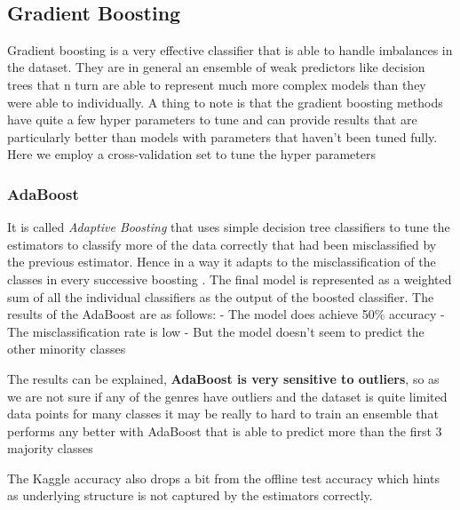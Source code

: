 \documentclass[11pt]{article}
\begin{document}
    \begin{center}
    \end{center}
    { \hspace*{\fill} \\}
    
    \hypertarget{gradient-boosting}{%
\subsection{Gradient Boosting}\label{gradient-boosting}}

Gradient boosting is a very effective classifier that is able to handle
imbalances in the dataset. They are in general an ensemble of weak
predictors like decision trees that n turn are able to represent much
more complex models than they were able to individually. A thing to note
is that the gradient boosting methods have quite a few hyper parameters
to tune and can provide results that are particularly better than models
with parameters that haven't been tuned fully. Here we employ a
cross-validation set to tune the hyper parameters

    \hypertarget{adaboost}{%
\subsubsection{AdaBoost}\label{adaboost}}

It is called \emph{Adaptive Boosting} that uses simple decision tree
classifiers to tune the estimators to classify more of the data
correctly that had been misclassified by the previous estimator. Hence
in a way it adapts to the misclassification of the classes in every
successive boosting . The final model is represented as a weighted sum
of all the individual classifiers as the output of the boosted
classifier. The results of the AdaBoost are as follows: - The model does
achieve 50\% accuracy - The misclassification rate is low - But the
model doesn't seem to predict the other minority classes

The results can be explained, \textbf{AdaBoost is very sensitive to
outliers}, so as we are not sure if any of the genres have outliers and
the dataset is quite limited data points for many classes it may be
really to hard to train an ensemble that performs any better with
AdaBoost that is able to predict more than the first 3 majority classes

The Kaggle accuracy also drops a bit from the offline test accuracy
which hints as underlying structure is not captured by the estimators
correctly.
\end{document}
